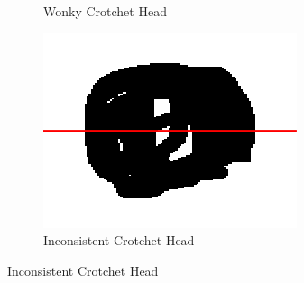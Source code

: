 \begin{figure}[H]
\begin{subfigure}[b]{.32\linewidth}
        \caption{Wonky Crotchet Head}
    \end{subfigure}
    \begin{subfigure}[b]{.32\linewidth}
        \centering
        \includegraphics[width=\linewidth]{gfx/techniques/scoring/note-head/6192-centroid-centre.png}
        \caption{Inconsistent Crotchet Head}
    \end{subfigure}


\end{figure}
